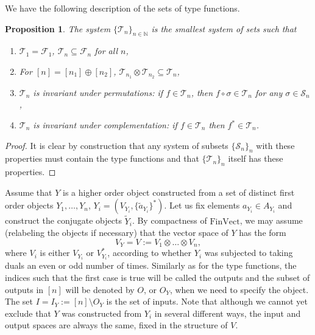 \documentclass[12pt]{article}
\newtheorem{prop}{Proposition}
\theoremstyle{definition}
\theoremstyle{remark}
\def\Te{\mathcal T}
\def\Fe{\mathcal F}
\def\Se {\mathcal S}
\def\permut{\mathscr{S}}
\def \FV{\mathrm{FinVect}}
\begin{document}
We have the following  description of the sets of type functions.

\begin{prop}\label{prop:type_min} The system  $\{\Te_n\}_{n\in \mathbb N}$ is the smallest
system of sets such that
\begin{enumerate}
\item $\Te_1=\Fe_1$, $\Te_n\subseteq \Fe_n$ for all $n$,

\item For $[n]=[n_1]\oplus [n_2]$, $\Te_{n_1}\otimes \Te_{n_2}\subseteq \Te_{n}$,
\item $\Te_n$  is invariant under permutations: if $f\in \Te_n$, then $f\circ \sigma\in
\Te_n$ for any $\sigma\in \permut_n$,
\item $\Te_n$  is invariant under complementation: if $f\in \Te_n$ then $f^*\in \Te_n$.

\end{enumerate}

\end{prop}


\begin{proof} It is clear by construction that any system of subsets $\{\Se_n\}_n$ with
these properties must contain the type functions and that $\{\Te_n\}_n$ itself has these
properties.

\end{proof}

  

Assume that  $Y$ is a higher order object constructed from a set of distinct first
order objects $Y_1,\dots, Y_n$, $Y_i=(V_{Y_i},\{\tilde a_{Y_i}\}^*)$.
Let us fix elements $a_{Y_i}\in A_{Y_i}$ and construct the conjugate objects $\tilde Y_i$. 
By compactness of $\FV$, we may assume (relabeling the objects if necessary) that the vector space of $Y$ has the form
\[
V_Y=V:=V_{1}\otimes \dots\otimes V_{n},
\]
where  $V_i$ is either $V_{Y_i}$ or $V_{Y_i}^*$, according to whether $Y_i$ was subjected
to taking duals an even or odd number of times. Similarly as for the type functions, the indices such that the first
case is true will be called the  outputs and the subset of outputs in $[n]$ will be denoted
by $O$, or $O_Y$, when we need to specify the object. The set $I=I_Y:=[n]\setminus O_Y$ is
the set of  inputs. Note that although we cannot yet exclude that $Y$ was constructed from
$Y_i$ in several different ways, the input and output spaces are always the same, fixed in 
the structure of $V$.
\end{document}
